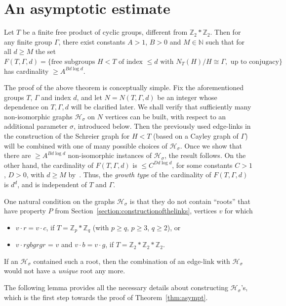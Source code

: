 \documentclass[ALCO,ThmDefs,Unicode,epreuves]{cedram}
\newcommand{\ZZ}{\mathbb{Z}}
\newcommand{\NN}{\mathbb{N}}
\newcommand{\cH}{\mathcal{H}}
\begin{document}
\section{An asymptotic estimate}\label{asymptotic-estimate}

\begin{theo}\label{thm:asympt}
Let $T$ be a finite free product of cyclic groups, different from $\ZZ_2*\ZZ_2$. Then for any finite group ${\Gamma}$, there exist constants $A > 1$, $B > 0$ and $M\in\NN$ such that for all $d{\geq}M$ the set $F(T, {\Gamma}, d) = \{\text{free subgroups } H < T \text{ of index } \leq d \text{ with } N_T(H)/H\cong {\Gamma}, \text{ up to conjugacy}\}$ has cardinality ${\geq}A^{B d\log d}$.
\end{theo}

The proof of the above theorem is conceptually simple. Fix the aforementioned groups $T$, $\Gamma$ and index $d$, and let $N = N(T, \Gamma, d)$ be an integer whose dependence on $T, \Gamma, d$ will be clarified later. We shall verify that sufficiently many non-isomorphic graphs $\cH_{\sigma}$ on $N$ vertices can be built, with respect to an additional parameter $\sigma$, introduced below. Then the previously used edge-links in the construction of the Schreier graph for $H < T$ (based on a Cayley graph of $\Gamma$) will be combined with one of many possible choices of $\cH_{\sigma}$. Once we show that there are $\geq A^{B d \log d}$ non-isomorphic instances of $\cH_\sigma$, the result follows. On the other hand, the cardinality of $F(T, \Gamma, d)$ is $\leq C^{D d\log d}$, for some constants $C > 1$, $D > 0$, with $d \geq M$ by~\cite{Bollobas}. Thus, the \emph{growth type} of the cardinality of $F(T, \Gamma, d)$ is $d^d$, and is independent of $T$ and $\Gamma$.

One natural condition on the graphs $\cH_{\sigma}$ is that they do not contain ``roots'' that have property $P$ from Section~\ref{section:constructionofthelinks}, \ie vertices $v$ for which 
\begin{itemize}
\item $v \cdot r = v \cdot c$, if $T = \ZZ_p*\ZZ_q$ (with $p\geq q$, $p\geq 3$, $q\geq 2$), or
\item $v \cdot rgbgrgr$ = $v$ and $v \cdot b = v \cdot g$, if $T = \ZZ_2*\ZZ_2*\ZZ_2$.
\end{itemize}
If an $\cH_\sigma$ contained such a root, then the combination of an edge-link with $\cH_\sigma$ would not have a \emph{unique} root any more.

The following lemma provides all the necessary details about constructing $\cH_\sigma$'s, which is the first step towards the proof of Theorem~\ref{thm:asympt}.
\end{document}
